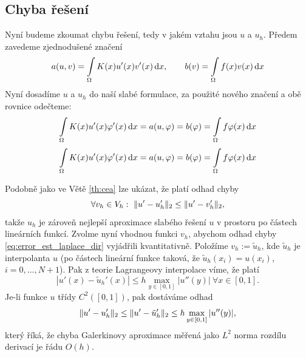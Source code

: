 \subsection{Chyba řešení}

Nyní budeme zkoumat chybu řešení, tedy v jakém vztahu jsou $u$ a $u_h$.
Předem zavedeme zjednodušené značení
\[
a(u,v) = \int\limits_\Omega K(x) u'(x) v'(x) \,{\rm d} x, \qquad b(v) = \int\limits_\Omega f(x) v(x) \,{\rm d} x
\]
Nyní dosadíme $u$ a $u_h$ do naší slabé formulace, za použité nového značení a obě rovnice odečteme:
\[
\int\limits_\Omega K(x) u'(x) \varphi'(x) \,{\rm d} x = a(u,\varphi) = b(\varphi) = \int\limits_\Omega f \varphi(x) \,{\rm d} x
\]
\[
\int\limits_\Omega K(x) u'(x) \varphi'(x) \,{\rm d} x = a(u,\varphi) = b(\varphi) = \int\limits_\Omega f \varphi(x) \,{\rm d} x
\]



Podobně jako ve Větě \ref{th:cea} lze ukázat, že platí odhad chyby
\begin{equation}\label{eq:error_est_laplace_dir}
\forall v_h\in V_h:~\|u'-u_h'\|_2 \le \|u'-v_h'\|_2,
\end{equation}
takže $u_h$ je zároveň nejlepší aproximace slabého řešení $u$ v prostoru po částech lineárních funkcí.
Zvolme nyní vhodnou funkci $v_h$, abychom odhad chyby \eqref{eq:error_est_laplace_dir} vyjádřili kvantitativně.
Položíme $v_h:=\tilde u_h$, kde $\tilde u_h$ je interpolanta $u$ (po částech lineární funkce taková, že $\tilde u_h(x_i)=u(x_i)$, $i=0,...,N+1$).
Pak z teorie Lagrangeovy interpolace víme, že platí
\[ |u'(x)-\tilde u_h'(x)|\le h\max_{y\in[0,1]}|u''(y)| ~\forall x\in[0,1]. \]
Je-li funkce $u$ třídy $C^2([0,1])$, pak dostáváme odhad
\[ \|u'-u_h'\|_2 \le \|u'-\tilde u_h'\|_2 \le h\max_{y\in[0,1]}|u''(y)|, \]
který říká, že chyba Galerkinovy aproximace měřená jako $L^2$ norma rozdílu derivací je řádu $O(h)$.






